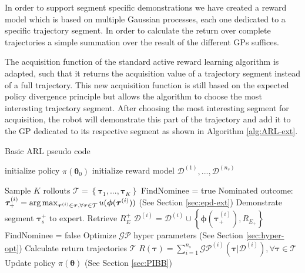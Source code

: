 \documentclass[mscThesis.tex]{subfiles}
\begin{document}
In order to support segment specific demonstrations we have created a reward model which is based on multiple Gaussian processes, each one dedicated to a specific trajectory segment. In order to calculate the return over complete trajectories a simple summation over the result of the different GPs suffices. 

The acquisition function of the standard active reward learning algorithm is adapted, such that it returns the acquisition value of a trajectory segment instead of a full trajectory. This new acquisition function is still based on the expected policy divergence principle but allows the algorithm to choose the most interesting trajectory segment. After choosing the most interesting segment for acquisition, the robot will demonstrate this part of the trajectory and add it to the GP dedicated to its respective segment as shown in Algorithm \ref{alg:ARL-ext}.

\begin{algorithm}[!ht]
\caption{Basic ARL pseudo code}
\label{alg:ARL-ext}
\begin{algorithmic}
\State initialize policy $\pi(\bm{\theta}_0)$
\State initialize reward model $\mathcal{D}^{(1)},..., \mathcal{D}^{(n_s)}$

\State


\State Sample $K$ rollouts
\State $\mathcal{T} = \left\{\bm{\tau}_1, ..., \bm{\tau}_K \right\}$
\State
\State FindNominee = true
\State Nominated outcome:
\State $\bm{\tau}_{+}^{(i)} = \operatorname*{arg\,max}_{\bm{\tau}^{(i)} \in \bm{\tau}, \forall \bm{\tau} \in \mathcal{T}} u(\bm{\phi}(\bm{\tau}^{(i)}))$  (See Section \ref{sec:epd-ext})
\State
{}
\State Demonstrate segment $\bm{\tau}^+_s$ to expert. Retrieve $R_E^+$
\State $\mathcal{D}^{(i)} = \mathcal{D}^{(i)} \cup \left\{ \bm{\phi}(\bm{\tau}_{+}^{(i)}) , R_{E_+}\right\}$
\Else
\State FindNominee = false
\EndIf 
\EndWhile
\State Optimize $\mathcal{GP}$ hyper parameters (See Section \ref{sec:hyper-opt})
\State
\State Calculate return trajectories $\mathcal{T}$
\State $R(\bm{\tau}) = \sum_{i=1}^{n_s} \mathcal{GP}^{(i)} (\bm{\tau} | \mathcal{D}^{(i)}), \forall \bm{\tau} \in \mathcal{T}$
\State Update policy $\pi (\bm{\theta})$ (See Section \ref{sec:PIBB})
\EndWhile
\end{algorithmic}
\end{algorithm}

%
\end{document}
